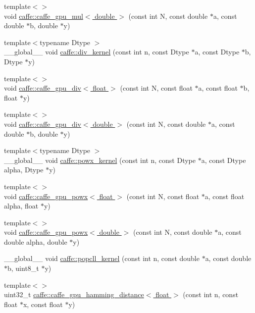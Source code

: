 \begin{DoxyCompactItemize}
\item 
{\footnotesize template$<$$>$ }\\void \hyperlink{namespacecaffe_a6944cc28fe65abfa6cec8b8dc7aea26d}{caffe\+::caffe\+\_\+gpu\+\_\+mul$<$ double $>$} (const int N, const double $\ast$a, const double $\ast$b, double $\ast$y)
\item 
{\footnotesize template$<$typename Dtype $>$ }\\\+\_\+\+\_\+global\+\_\+\+\_\+ void \hyperlink{namespacecaffe_aafc93f3ad4961c88d19ba574112250a8}{caffe\+::div\+\_\+kernel} (const int n, const Dtype $\ast$a, const Dtype $\ast$b, Dtype $\ast$y)
\item 
{\footnotesize template$<$$>$ }\\void \hyperlink{namespacecaffe_ab16bf45f3c2b83f59c1991960bf23c2f}{caffe\+::caffe\+\_\+gpu\+\_\+div$<$ float $>$} (const int N, const float $\ast$a, const float $\ast$b, float $\ast$y)
\item 
{\footnotesize template$<$$>$ }\\void \hyperlink{namespacecaffe_aa65bd487aa7c59bf85dfa626dae789c8}{caffe\+::caffe\+\_\+gpu\+\_\+div$<$ double $>$} (const int N, const double $\ast$a, const double $\ast$b, double $\ast$y)
\item 
{\footnotesize template$<$typename Dtype $>$ }\\\+\_\+\+\_\+global\+\_\+\+\_\+ void \hyperlink{namespacecaffe_a9e8f995a5fe430af483f934f6db51ac8}{caffe\+::powx\+\_\+kernel} (const int n, const Dtype $\ast$a, const Dtype alpha, Dtype $\ast$y)
\item 
{\footnotesize template$<$$>$ }\\void \hyperlink{namespacecaffe_a5a3244754d20c867f7c3c0e13ede7b86}{caffe\+::caffe\+\_\+gpu\+\_\+powx$<$ float $>$} (const int N, const float $\ast$a, const float alpha, float $\ast$y)
\item 
{\footnotesize template$<$$>$ }\\void \hyperlink{namespacecaffe_a9ae99fa052a8edddd8d431595e8dc317}{caffe\+::caffe\+\_\+gpu\+\_\+powx$<$ double $>$} (const int N, const double $\ast$a, const double alpha, double $\ast$y)
\item 
\+\_\+\+\_\+global\+\_\+\+\_\+ void \hyperlink{namespacecaffe_ae307157ab0a91393f5708d5a37bf83bc}{caffe\+::popcll\+\_\+kernel} (const int n, const double $\ast$a, const double $\ast$b, uint8\+\_\+t $\ast$y)
\item 
{\footnotesize template$<$$>$ }\\uint32\+\_\+t \hyperlink{namespacecaffe_aa9d0abbc1318f21d421c50b8e9681566}{caffe\+::caffe\+\_\+gpu\+\_\+hamming\+\_\+distance$<$ float $>$} (const int n, const float $\ast$x, const float $\ast$y)

\end{DoxyCompactItemize}
